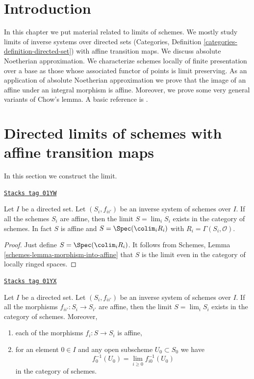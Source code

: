 \section{Introduction}
\label{limits-section-introduction}
In this chapter we put material related to limits of schemes. We mostly
study limits of inverse systems over directed sets
(Categories, Definition \ref{categories-definition-directed-set})
with affine transition maps. We discuss absolute Noetherian
approximation. We characterize schemes locally of finite presentation
over a base as those whose associated functor of points is limit
preserving. As an application of absolute Noetherian approximation
we prove that the image of an affine under an integral morphism is affine.
Moreover, we prove some very general variants of Chow's lemma.
A basic reference is \cite{EGA}.

\section{Directed limits of schemes with affine transition maps}
\label{limits-section-limits}
In this section we construct the limit.

\begin{lemma}
\label{limits-lemma-directed-inverse-system-affine-schemes-has-limit}
\href{https://stacks.math.columbia.edu/tag/01YW}{\texttt{Stacks tag 01YW}}

Let $I$ be a directed set. Let $(S_i, f_{ii'})$ be an inverse system of
schemes over $I$.  If all the schemes $S_i$
are affine, then the limit $S = \lim_i S_i$ exists
in the category of schemes.
In fact $S$ is affine and $S = \Spec(\colim_i R_i)$
with $R_i = \Gamma(S_i, \mathcal{O})$.
\end{lemma}

\begin{proof}
Just define $S = \Spec(\colim_i R_i)$.
It follows from Schemes, Lemma \ref{schemes-lemma-morphism-into-affine}
that $S$ is the limit even in the category of locally ringed spaces.
\end{proof}

\begin{lemma}
\label{limits-lemma-directed-inverse-system-has-limit}
\href{https://stacks.math.columbia.edu/tag/01YX}{\texttt{Stacks tag 01YX}}

Let $I$ be a directed set. Let $(S_i, f_{ii'})$ be an
inverse system of schemes over $I$. If all the morphisms
$f_{ii'} : S_i \to S_{i'}$ are affine, then the limit $S = \lim_i S_i$ exists
in the category of schemes. Moreover,
\begin{enumerate}
\item each of the morphisms $f_i : S \to S_i$ is affine,
\item for an element $0 \in I$ and any open subscheme $U_0 \subset S_0$
we have
$$
f_0^{-1}(U_0) = \lim_{i \geq 0} f_{i0}^{-1}(U_0)
$$
in the category of schemes.
\end{enumerate}
\end{lemma}

